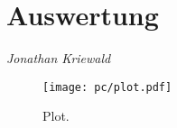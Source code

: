 \section{Auswertung}
\label{sec:Auswertung}
{\footnotesize \textit{Jonathan Kriewald}}

\begin{figure}
  \centering
  \texttt{[image: pc/plot.pdf]}
  \caption{Plot.}
  \label{fig:plot}
\end{figure}
